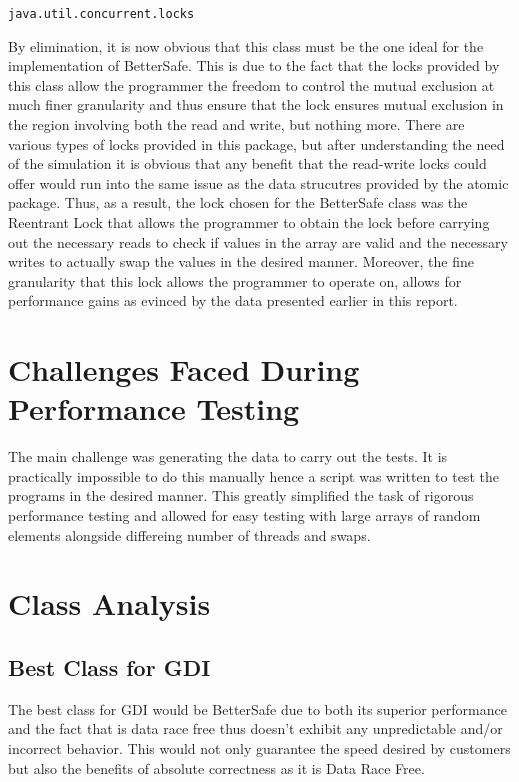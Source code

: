 \begin{verbatim}
java.util.concurrent.locks
\end{verbatim}
By elimination, it is now obvious that this class must be the one ideal for the implementation of BetterSafe. This is due to the fact that the locks provided by this class allow the programmer the freedom to control the mutual exclusion at much finer granularity and thus ensure that the lock ensures mutual exclusion in the region involving both the read and write, but nothing more. 
There are various types of locks provided in this package, but after understanding the need of the simulation it is obvious that any benefit that the read-write locks could offer would run into the same issue as the data strucutres provided by the atomic package. Thus, as a result, the lock chosen for the BetterSafe class was the Reentrant Lock that allows the programmer to obtain the lock before carrying out the necessary reads to check if values in the array are valid and the necessary writes to actually swap the values in the desired manner. 
Moreover, the fine granularity that this lock allows the programmer to operate on, allows for performance gains as evinced by the data presented earlier in this report. 

\section{Challenges Faced During Performance Testing}
The main challenge was generating the data to carry out the tests. It is practically impossible to do this manually hence a script was written to test the programs in the desired manner. This greatly simplified the task of rigorous performance testing and allowed for easy testing with large arrays of random elements alongside differeing number of threads and swaps. 

\section{Class Analysis}
\subsection{Best Class for GDI}
The best class for GDI would be BetterSafe due to both its superior performance and the fact that is data race free thus doesn't exhibit any unpredictable and/or incorrect behavior. This would not only guarantee the speed desired by customers but also the benefits of absolute correctness as it is Data Race Free. 

